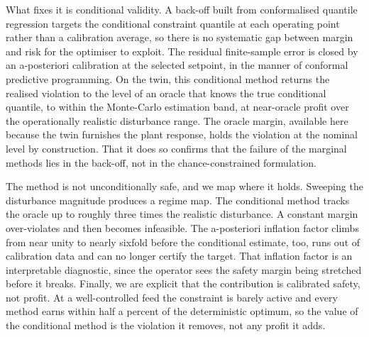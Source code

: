 What fixes it is conditional validity. A back-off built from conformalised quantile
regression \citep{romano2019} targets the conditional constraint quantile at each operating
point rather than a calibration average, so there is no systematic gap between margin and
risk for the optimiser to exploit. The residual finite-sample error is closed by an
a-posteriori calibration at the selected setpoint, in the manner of conformal predictive
programming. On the twin, this conditional method returns the realised violation to the
level of an oracle that knows the true conditional quantile, to within the Monte-Carlo
estimation band, at near-oracle profit over the operationally realistic disturbance range.
The oracle margin, available here because the twin furnishes the plant response, holds the
violation at the nominal level by construction. That it does so confirms that the failure
of the marginal methods lies in the back-off, not in the chance-constrained formulation.

The method is not unconditionally safe, and we map where it holds. Sweeping the disturbance
magnitude produces a regime map. The conditional method tracks the oracle up to roughly
three times the realistic disturbance. A constant margin over-violates and then becomes
infeasible. The a-posteriori inflation factor climbs from near unity to nearly sixfold
before the conditional estimate, too, runs out of calibration data and can no longer
certify the target. That inflation factor is an interpretable diagnostic, since the operator
sees the safety margin being stretched before it breaks. Finally, we are explicit that the
contribution is calibrated safety, not profit. At a well-controlled feed the constraint is
barely active and every method earns within half a percent of the deterministic optimum, so
the value of the conditional method is the violation it removes, not any profit it adds.


